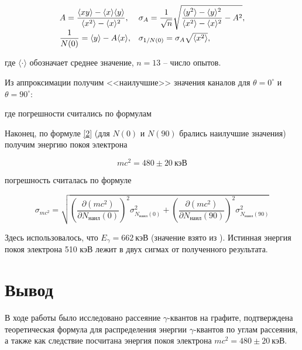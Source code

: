 \documentclass[15pt,a5paper,reqno]{article}
\begin{document}

\[\begin{array}{l l}
A = \dfrac{\langle xy \rangle - \langle x \rangle \langle y \rangle}{\langle x^2 \rangle - \langle x \rangle^2}, & \sigma_A = \dfrac{1}{\sqrt{n}}\sqrt{\dfrac{\langle y^2 \rangle - \langle y \rangle^2}{\langle x^2 \rangle - \langle x \rangle^2} - A^2},\\
\dfrac{1}{N(0)} = \langle y \rangle - A \langle x \rangle, & \sigma_{1/N(0)} = \sigma_A \sqrt{\langle x^2\rangle},\\
\end{array}\]

где $\langle \cdot \rangle$ обозначает среднее значение, $n = 13$ -- число опытов.


Из аппроксимации получим <<наилучшие>> значения каналов для $\theta = 0^\circ$ и $\theta = 90^\circ$:


где погрешности считались по формулам
 

Наконец, по формуле \eqref{2} (для $N(0)$ и $N(90)$ брались наилучшие значения) получим энергию покоя электрона
    
    \[ mc^2 = 480 \pm 20~\text{кэВ} \]

погрешность считалась по формуле

\[\sigma_{mc^2} = \sqrt{ \left( \dfrac{\partial (mc^2)}{\partial N_{\text{наил}}(0)} \right)^2 \sigma_{N_{\text{наил}}(0)}^2 +\left( \dfrac{\partial (mc^2)}{\partial N_{\text{наил}}(90)} \right)^2 \sigma_{N_{\text{наил}}(90)}^2 }\]

Здесь использовалось, что $E_\gamma = 662~\text{кэВ}$ (значение взято из \cite{laba}). Истинная энергия покоя электрона 510 кэВ лежит в двух сигмах от полученного результата.

\section{Вывод}

В ходе работы было исследовано рассеяние $\gamma$-квантов на графите, подтверждена теоретическая формула для распределения энергии $\gamma$-квантов по углам рассеяния, а также как следствие посчитана энергия покоя электрона $mc^2 = 480 \pm 20 ~\text{кэВ}$.
\end{document}
